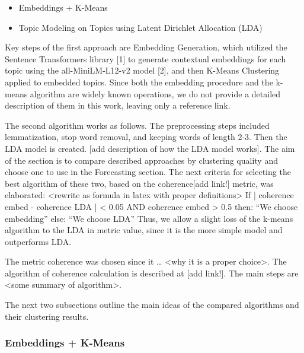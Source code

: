 \begin{itemize}
\item Embeddings + K-Means
\item Topic Modeling on Topics using Latent Dirichlet Allocation (LDA)
\end{itemize}

Key steps of the first approach are Embedding Generation, which utilized the Sentence Transformers library [1] to generate contextual embeddings for each topic using the all-MiniLM-L12-v2 model [2], and then K-Means Clustering applied to embedded topics. Since both the embedding procedure and the k-means algorithm are widely known operations, we do not provide a detailed description of them in this work, leaving only a reference link.

The second algorithm works as follows. The preprocessing steps included lemmatization, stop word removal, and keeping words of length 2-3. Then the LDA model is created. [add description of how the LDA model works].
The aim of the section is to compare described approaches by clustering quality and choose one to use in the Forecasting section.
The next criteria for selecting the best algorithm of these two, based on the coherence[add link!] metric, was elaborated: 
<rewrite as formula in latex with proper definitions>
If | coherence embed - coherence LDA | < 0.05 AND coherence embed > 0.5
then: “We choose embedding”
else: “We choose LDA”
Thus, we allow a slight loss of the k-means algorithm to the LDA in metric value, since it is the more simple model and outperforms LDA.



The metric coherence was chosen since it … <why it is a proper choice>. The algorithm of coherence calculation is described at [add link!]. The main steps are <some summary of algorithm>.


The next two subsections outline the main ideas of the compared algorithms and their clustering results.

\subsubsection{Embeddings + K-Means}

